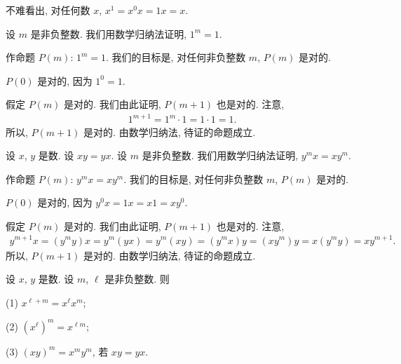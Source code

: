 \documentclass[../libro.tex]{subfiles}
\begin{document}
不难看出, 对任何数 \(x\), \(x^1 = x^0 x = 1 x = x\).

\begin{example}
    设 \(m\) 是非负整数.
    我们用数学归纳法证明,
    \(1^m = 1\).

    作命题 \(P(m)\):
    \(1^m = 1\).
    我们的目标是,
    对任何非负整数 \(m\), \(P(m)\) 是对的.

    \(P(0)\) 是对的, 因为
    \(1^0 = 1\).

    假定 \(P(m)\) 是对的.
    我们由此证明, \(P(m+1)\) 也是对的.
    注意,
    \begin{align*}
        1^{m+1} = 1^m \cdot 1 = 1 \cdot 1 = 1.
    \end{align*}
    所以, \(P(m+1)\) 是对的.
    由数学归纳法, 待证的命题成立.
\end{example}

\begin{example}
    设 \(x\), \(y\) 是数.
    设 \(x y = y x\).
    设 \(m\) 是非负整数.
    我们用数学归纳法证明,
    \(y^m x = x y^m\).

    作命题 \(P(m)\): \(y^m x = x y^m\).
    我们的目标是,
    对任何非负整数 \(m\), \(P(m)\) 是对的.

    \(P(0)\) 是对的, 因为
    \(y^0 x = 1 x = x 1 = x y^0\).

    假定 \(P(m)\) 是对的.
    我们由此证明, \(P(m+1)\) 也是对的.
    注意,
    \begin{align*}
        y^{m+1} x
        = (y^m y) x
        = y^m (y x)
        = y^m (x y)
        = (y^m x) y
        = (x y^m) y
        = x (y^m y)
        = x y^{m+1}.
    \end{align*}
    所以, \(P(m+1)\) 是对的.
    由数学归纳法, 待证的命题成立.
\end{example}

\begin{theorem}
    设 \(x\), \(y\) 是数.
    设 \(m\), \(\ell\) 是非负整数.
    则

    (1)
    \(x^{\ell+m} = x^{\ell} x^{m}\);

    (2)
    \((x^{\ell})^{m} = x^{\ell m}\);

    (3)
    \((x y)^{m} = x^m y^m\), 若 \(x y = y x\).
\end{theorem}
\end{document}
